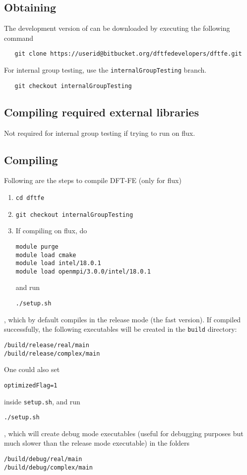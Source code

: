 \subsection{Obtaining \dftfe{}}
The development version of \dftfe{} can be downloaded by executing the following command
\begin{verbatim}
   git clone https://userid@bitbucket.org/dftfedevelopers/dftfe.git
\end{verbatim}
For internal group testing, use the \verb|internalGroupTesting| branch.
\begin{verbatim}
   git checkout internalGroupTesting
\end{verbatim}

\subsection{Compiling required external libraries}
Not required for internal group testing if trying to run \dftfe{} on flux.

\subsection{Compiling \dftfe{}}
Following are the steps to compile DFT-FE (only for flux)
\begin{enumerate}
\item   \begin{verbatim}
cd dftfe
\end{verbatim}
\item \begin{verbatim}
git checkout internalGroupTesting
\end{verbatim}
\item  If compiling on flux, do
\begin{verbatim}
module purge
module load cmake
module load intel/18.0.1
module load openmpi/3.0.0/intel/18.0.1
\end{verbatim}
and run
\begin{verbatim}
./setup.sh
\end{verbatim} 
\end{enumerate}
, which by default compiles in the release mode (the fast version). If \dftfe{} compiled successfully, the following executables will be created in the \verb|build| directory:
\begin{verbatim}
/build/release/real/main
/build/release/complex/main
\end{verbatim}
One could also set
\begin{verbatim}
optimizedFlag=1
\end{verbatim}
inside \verb|setup.sh|, and run
\begin{verbatim}
./setup.sh
\end{verbatim}
, which will create debug mode executables (useful for debugging purposes but much slower than the release mode executable) in the folders
\begin{verbatim}
/build/debug/real/main
/build/debug/complex/main
\end{verbatim}
 
